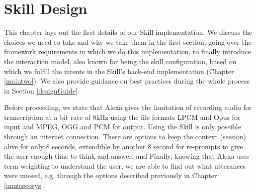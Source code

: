 \chapter{Skill Design} %
\label{mainone}




This chapter lays out the first details of our Skill implementation. We discuss the choices we need to take and why we take them in the first section, going over the framework requirements in which we do this implementation, to finally introduce the interaction model, also known for being the skill configuration, based on which we fulfill the intents in the Skill's back-end implementation (Chapter \ref{maintwo}). We also provide guidance on best practices during the whole process in Section \ref{designGuide}.

Before proceeding, we state that Alexa gives the limitation of recording audio for transcription at a bit rate of 8kHz using the file formats LPCM and Opus for input and MPEG, OGG and PCM for output. Using the Skill is only possible through an internet connection. There are options to keep the context (session) alive for only 8 seconds, extendible by another 8 second for re-prompts to give the user enough time to think and answer. and Finally, knowing that Alexa uses term weighting to understand the user, we are able to find out what utterances were missed, e.g. through the options described previously in Chapter \ref{amznecosys}. 


%

%
%





